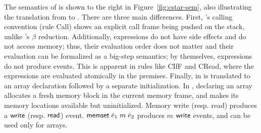 The semantics of \cstar is shown to the right in
Figure~\ref{fig:cstar-sem}, also illustrating the translation
from \lamstar to \cstar. There are three main differences.
First, \cstar's calling convention (rule {\sc
Call}) shows an explicit call frame being pushed on the stack, unlike
\lamstar's $\beta$ reduction.
%
Additionally, \cstar expressions do not have side effects and do not
access memory; thus, their evaluation order does not matter and their
evaluation can be formalized as a big-step semantics; by themselves,
expressions do not produce events. This is apparent in rules like {\sc
CIfF} and {\sc CRead}, where the expressions are evaluated atomically
in the premises.
%
Finally,  in \lamstar is translated to an array declaration
followed by a separate initialization. In \cstar, declaring an array
allocates a fresh memory block in the current memory frame, and makes
its memory locations available but uninitialized.  Memory write
(resp. read) produces a $\text{\textsf{write}}$ (resp. $\text{\textsf{read}}$)
event. $\text{\textsf{memset}}\;\hat{e}_1\;m\;\hat{e}_2$ produces $m$ $\text{\textsf{write}}$ events,
and can be used only for arrays.





